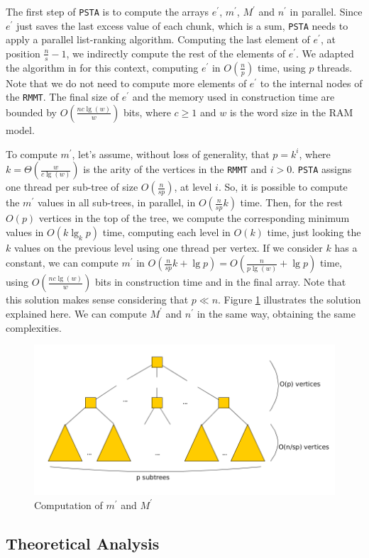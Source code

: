 The first step of {\tt PSTA} is to compute the arrays $e^{\prime}$, $m^{\prime}$, $M^{\prime}$ and $n^{\prime}$ in parallel. Since $e^{\prime}$ just saves the last excess value of each chunk, which is a sum, {\tt PSTA} needs to apply a parallel list-ranking algorithm. Computing the last element of $e^{\prime}$, at position $\frac{n}{s}-1$, we indirectly compute the rest of the elements of $e^{\prime}$. We adapted the algorithm in \cite{Helman2001265} for this context, computing $e^{\prime}$ in $O(\frac{n}{p})$ time, using $p$ threads. Note that we do not need to compute more elements of $e^{\prime}$ to the internal nodes of the {\tt RMMT}. The final size of $e^{\prime}$  and the memory used in construction time are bounded by $O(\frac{nc\lg(w)}{w})$ bits, where $c\geqslant 1$ and $w$ is the word size in the RAM model.

To compute $m^{\prime}$, let's assume, without loss of generality, that $p = k^{i}$, where $k = \Theta(\frac{w}{c\lg(w)})$ is the arity of the vertices in the {\tt RMMT} and $i > 0$. {\tt PSTA} assigns one thread per sub-tree of size $O(\frac{n}{sp})$, at level $i$. So, it is possible to compute the $m^{\prime}$ values in all sub-trees, in parallel, in $O(\frac{n}{sp}k)$ time. Then, for the rest $O(p)$ vertices in the top of the tree, we compute the corresponding minimum values in $O(k\lg_{k} p)$ time, computing each level in $O(k)$ time, just looking the $k$ values on the previous level using one thread per vertex. If we consider $k$ has a constant, we can compute $m^{\prime}$ in $O(\frac{n}{sp}k + \lg p) = O(\frac{n}{p\lg(w)}+\lg p)$ time, using $O(\frac{nc\lg(w)}{w})$ bits in construction time and in the final array. Note that this solution makes sense considering that $p\ll n$. Figure \ref{fig:min-max-array} illustrates the solution explained here. We can compute $M^{\prime}$ and $n^{\prime}$ in the same way, obtaining the same complexities.

	 	\begin{figure}[ht]
			\centering
			\includegraphics[scale=0.28]{./images/Min-Max-array.png}
     		\caption{Computation of $m^{\prime}$ and $M^{\prime}$}
			\label{fig:min-max-array} 
		\end{figure}


\subsection{Theoretical Analysis}

